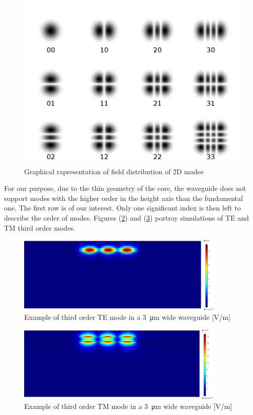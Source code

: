 \documentclass[12pt,a4paper,twoside]{article}
\begin{document}
\begin{figure}[!ht]
	\centering
	\includegraphics[width=.4\textwidth]{2Dmodes.png}
	\caption{Graphical rapresentation of field distribution of 2D modes}
	\label{fig_2dmodes}
\end{figure}

For our purpose, due to the thin geometry of the core, the waveguide does not support modes with the higher order in the height axis than the fundamental one.
The first row is of our interest.
Only one significant index is then left to describe the order of modes.
Figures (\ref{fig_ex_mode_TE}) and (\ref{fig_ex_mode_TM}) portray simulations of TE and TM third order modes.
\begin{figure}[!hb]
	\centering
	\includegraphics[width=0.89\textwidth]{output_modeTE.png}
	\caption{Example of third order TE mode in a \SI{3}{\um} wide waveguide [V/m]}
	\label{fig_ex_mode_TE}
\end{figure}
\begin{figure}[!h]
	\centering
	\includegraphics[width=0.89\textwidth]{output_modeTM.png}
	\caption{Example of third order TM mode in a \SI{3}{\um} wide waveguide [V/m]}
	\label{fig_ex_mode_TM}
\end{figure}
\end{document}
